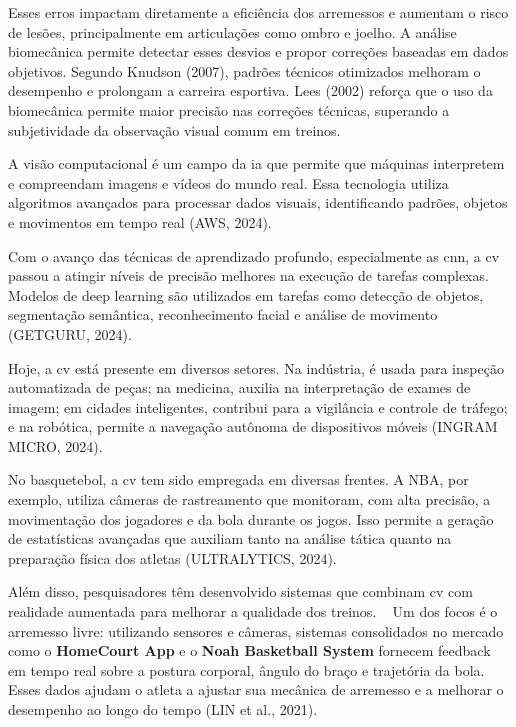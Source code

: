 Esses erros impactam diretamente a eficiência dos arremessos e aumentam o risco de lesões, principalmente em articulações como ombro e joelho. A análise biomecânica permite detectar esses desvios e propor correções baseadas em dados objetivos. 
Segundo Knudson (2007), padrões técnicos otimizados melhoram o desempenho e prolongam a carreira esportiva. Lees (2002) reforça que o uso da biomecânica permite maior precisão nas correções técnicas, 
superando a subjetividade da observação visual comum em treinos.



A visão computacional é um campo da \ac{ia} que permite que máquinas interpretem e compreendam imagens e vídeos do mundo real. 
Essa tecnologia utiliza algoritmos avançados para processar dados visuais, identificando padrões, objetos e movimentos em tempo real (AWS, 2024).

Com o avanço das técnicas de aprendizado profundo, especialmente as \ac{cnn}, a \ac{cv} passou a atingir níveis de precisão melhores na execução de tarefas complexas. 
Modelos de deep learning são utilizados em tarefas como detecção de objetos, segmentação semântica, reconhecimento facial e análise de movimento (GETGURU, 2024).

Hoje, a \ac{cv} está presente em diversos setores. Na indústria, é usada para inspeção automatizada de peças; na medicina, auxilia na interpretação de exames de imagem; em cidades inteligentes, 
contribui para a vigilância e controle de tráfego; e na robótica, permite a navegação autônoma de dispositivos móveis (INGRAM MICRO, 2024).


No basquetebol, a \ac{cv} tem sido empregada em diversas frentes. A NBA, por exemplo, utiliza câmeras de rastreamento que monitoram, com alta precisão, a movimentação dos jogadores e da bola durante os jogos. 
Isso permite a geração de estatísticas avançadas que auxiliam tanto na análise tática quanto na preparação física dos atletas (ULTRALYTICS, 2024).

Além disso, pesquisadores têm desenvolvido sistemas que combinam \ac{cv} com realidade aumentada para melhorar a qualidade dos treinos.  
Um dos focos é o arremesso livre: utilizando sensores e câmeras, sistemas consolidados no mercado como o \textbf{HomeCourt App} e o \textbf{Noah Basketball System} fornecem feedback em tempo real sobre a postura corporal, 
ângulo do braço e trajetória da bola. Esses dados ajudam o atleta a ajustar sua mecânica de arremesso e a melhorar o desempenho ao longo do tempo (LIN et al., 2021).

